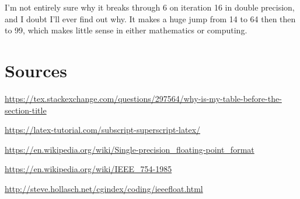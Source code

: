 \documentclass{article}
\begin{document}
I'm not entirely sure why it breaks through 6 on iteration 16 in double precision, and I doubt I'll ever find out why. It makes a huge jump from 14 to 64 then then to 99, which makes little sense in either mathematics or computing.  





\newpage

\section{Sources}

\url{https://tex.stackexchange.com/questions/297564/why-is-my-table-before-the-section-title}

\url{https://latex-tutorial.com/subscript-superscript-latex/}

\url{https://en.wikipedia.org/wiki/Single-precision_floating-point_format}

\url{https://en.wikipedia.org/wiki/IEEE_754-1985}

\url{http://steve.hollasch.net/cgindex/coding/ieeefloat.html}
\end{document}
